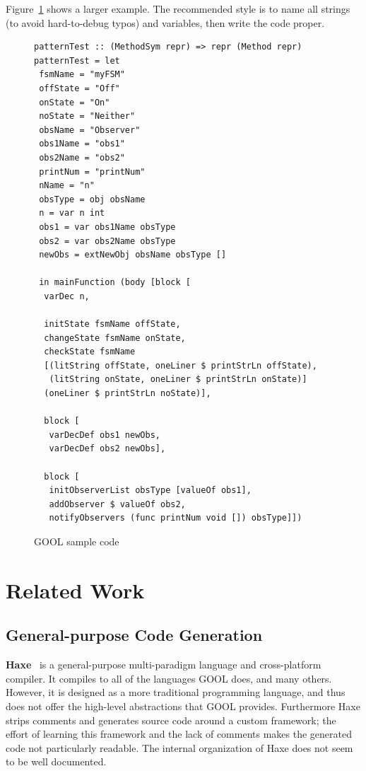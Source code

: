 \documentclass[sigplan,screen,10pt]{acmart}
\begin{document}
Figure~\ref{fig:code} shows a larger example.  The recommended style is
to name all strings (to avoid hard-to-debug typos) and variables, then
write the code proper.
\begin{figure}[tb]
\begin{lstlisting}
patternTest :: (MethodSym repr) => repr (Method repr)
patternTest = let 
 fsmName = "myFSM"
 offState = "Off"
 onState = "On"
 noState = "Neither"
 obsName = "Observer"
 obs1Name = "obs1"
 obs2Name = "obs2"
 printNum = "printNum"
 nName = "n"
 obsType = obj obsName
 n = var n int
 obs1 = var obs1Name obsType
 obs2 = var obs2Name obsType
 newObs = extNewObj obsName obsType []
   
 in mainFunction (body [block [
  varDec n,

  initState fsmName offState, 
  changeState fsmName onState,
  checkState fsmName 
  [(litString offState, oneLiner $ printStrLn offState), 
   (litString onState, oneLiner $ printStrLn onState)] 
  (oneLiner $ printStrLn noState)],

  block [
   varDecDef obs1 newObs, 
   varDecDef obs2 newObs],

  block [
   initObserverList obsType [valueOf obs1], 
   addObserver $ valueOf obs2,
   notifyObservers (func printNum void []) obsType]])
\end{lstlisting}
\caption{GOOL sample code}
\label{fig:code}
\end{figure}

\section{Related Work} \label{sec:related}

\subsection{General-purpose Code Generation}

\textbf{Haxe}~\cite{Haxe} is a general-purpose multi-paradigm language and cross-platform
compiler.  It compiles to all of the languages GOOL does, and many
others.  However, it is designed as a more traditional programming language, and
thus does not offer the high-level abstractions that GOOL provides. Furthermore
Haxe strips comments and generates source code around a custom framework; 
the effort of learning this framework and the lack of comments makes the generated
code not particularly readable. The internal organization of Haxe does not seem
to be well documented.
\end{document}
